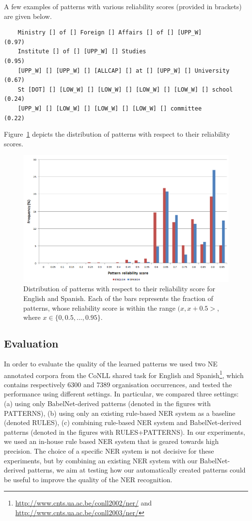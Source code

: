 \documentclass[output=paper]{langsci/langscibook}
\begin{document}
\noindent A few examples of patterns with various reliability scores
(provided in brackets) are given below.

{\small 
\begin{verbatim}
    Ministry [] of [] Foreign [] Affairs [] of [] [UPP_W]          (0.97)
    Institute [] of [] [UPP_W] [] Studies                          (0.95)
    [UPP_W] [] [UPP_W] [] [ALLCAP] [] at [] [UPP_W] [] University  (0.67)
    St [DOT] [] [LOW_W] [] [LOW_W] [] [LOW_W] [] [LOW_W] [] school (0.24)
    [UPP_W] [] [LOW_W] [] [LOW_W] [] [LOW_W] [] committee          (0.22)
\end{verbatim}
}

Figure~\ref{pattern-distr} depicts the distribution of patterns with
respect to their reliability scores.

\begin{figure}
\centering
\includegraphics[width=.95\textwidth]{figures/patterns-distr.png}
\caption{Distribution of patterns with respect to their reliability score for English and Spanish. Each of the bars represents the fraction of patterns, whose reliability score is within the range $(x,x+0.5>$, where $x \in \{0,0.5,...,0.95\}$.}
\label{pattern-distr}
\end{figure}

\subsection{Evaluation}
In order to evaluate the quality of the learned patterns we used two NE annotated corpora from the CoNLL shared task for English and Spanish\footnote{\url{http://www.cnts.ua.ac.be/conll2002/ner/} and \url{http://www.cnts.ua.ac.be/conll2003/ner/}}, which contains respectively 6300 and 7389 organisation occurrences, and tested the performance using different settings. In particular, we compared three settings: (a) using only BabelNet-derived patterns (denoted in the figures with PATTERNS),  (b) using only an existing rule-based NER system as a baseline (denoted RULES), (c) combining rule-based NER system and BabelNet-derived patterns (denoted in the figures with RULES+PATTERNS).
In our experiments, we used an in-house rule based NER system \citep{steinberger-11, ehrmann-15} that is geared towards high precision. The choice of a specific NER system is not decisive for these experiments, but by combining an existing NER system with our BabelNet-derived patterns, we aim at testing how our automatically created patterns could be useful to improve the quality of the NER recognition.
\end{document}
